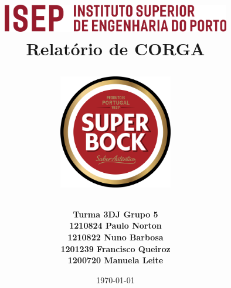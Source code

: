 \documentclass[]{report}
\title{
    \includegraphics[width=10cm]{media/isep.png} \\
    \vfill
    \LARGE\bfseries Relatório de CORGA\\
    \vfill
    \begin{figure}[h]
    \centering
    \includegraphics[width=5cm]{media/Super_Bock_Logo.png}
    \end{figure}

    \vfill
    
    }
\author{
    \large\bfseries Turma 3DJ \textunderscore\space Grupo 5  \\
    1210824 \textunderscore\space Paulo Norton \\
    1210822 \textunderscore\space Nuno Barbosa \\
    1201239 \textunderscore\space Francisco Queiroz \\
    1200720 \textunderscore\space Manuela Leite\\
    }
\date{\today}
\begin{document}
\maketitle


\tableofcontents
\hypertarget{glossary}{\printglossaries}






\appendix


\end{document}
